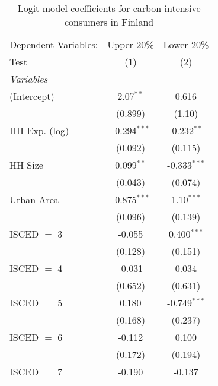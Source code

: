 
\begin{table}[htbp!]
   \centering
   \small
   \begin{adjustbox}{width = 1\textwidth, max height = 0.95\textheight, center}
      \begin{threeparttable}[b]
         \caption{\label{tab:Logit_1_FIN} Logit-model coefficients for carbon-intensive consumers in Finland}
         \begin{tabular}{lcc}
            \tabularnewline \midrule \midrule
            Dependent Variables: & Upper 20\%     & Lower 20\%\\   
            Test                 & (1)            & (2)\\  
            \midrule
            \emph{Variables}\\
            (Intercept)          & 2.07$^{**}$    & 0.616\\   
                                 & (0.899)        & (1.10)\\   
            HH Exp. (log)        & -0.294$^{***}$ & -0.232$^{**}$\\   
                                 & (0.092)        & (0.115)\\   
            HH Size              & 0.099$^{**}$   & -0.333$^{***}$\\   
                                 & (0.043)        & (0.074)\\   
            Urban Area           & -0.875$^{***}$ & 1.10$^{***}$\\   
                                 & (0.096)        & (0.139)\\   
            ISCED $=$ 3          & -0.055         & 0.400$^{***}$\\   
                                 & (0.128)        & (0.151)\\   
            ISCED $=$ 4          & -0.031         & 0.034\\   
                                 & (0.652)        & (0.631)\\   
            ISCED $=$ 5          & 0.180          & -0.749$^{***}$\\   
                                 & (0.168)        & (0.237)\\   
            ISCED $=$ 6          & -0.112         & 0.100\\   
                                 & (0.172)        & (0.194)\\   
            ISCED $=$ 7          & -0.190         & -0.137\\   

\end{tabular}
\end{threeparttable}
\end{adjustbox}
\end{table}
